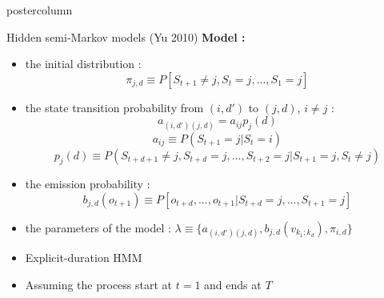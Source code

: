 \documentclass[final,hyperref={pdfpagelabels=false}]{beamer}
\begin{document}
\begin{frame}
\begin{columns}
\begin{column}{.49\textwidth}
\begin{beamercolorbox}[center,wd=\textwidth]{postercolumn}
\begin{minipage}[T]{.95\textwidth}
{\begin{block}{Hidden semi-Markov models (Yu 2010)}
                \vskip1cm
                \textbf{Model :}
                \vskip0.5cm
                \begin{itemize}
                    \item[\bullet] the initial distribution :
                    $$\pi_{j,d} \equiv P[S_{t+1} \neq j, S_t = j, ..., S_1 = j]$$
                    \item[\bullet] the state transition probability from $(i,d')$ to $(j,d)$, $i \neq j$ :
                    $$a_{(i,d')(j,d)}=a_{ij}p_j(d)$$
                    $$a_{ij} \equiv P(S_{t+1} = j | S_t = i)$$
                    $$p_j(d) \equiv P(S_{t+d+1} \neq j, S_{t+d} = j, ..., S_{t+2}=j | S_{t+1} = j, S_t \neq j)$$
                    \item[\bullet] the emission probability :
                    $$b_{j,d}(o_{t+1}) \equiv P[o_{t+d}, ..., o_{t+1} | S_{t+d} = j, ..., S_{t+1} = j]$$
                    \item[\bullet] the parameters of the model : $\lambda \equiv \{a_{(i,d')(j,d)},b_{j,d}(v_{k_1:k_d}), \pi_{i,d}\}$
                    \item[\hookrightarrow] Explicit-duration HMM
                    \item[\hookrightarrow] Assuming the process start at $t=1$ and ends at $T$
                \end{itemize}

            \end{block}
          }
        \end{minipage}
      \end{beamercolorbox}
    \end{column}


\end{columns}
\end{frame}
\end{document}
